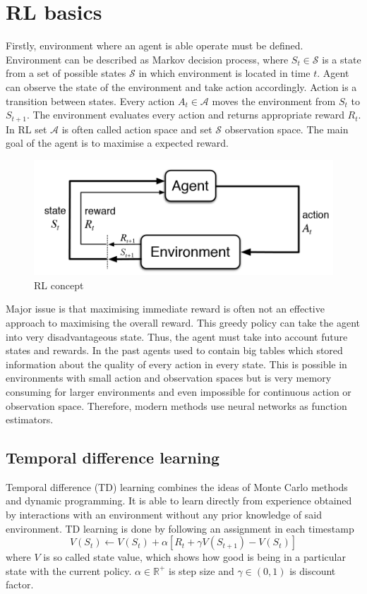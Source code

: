 \section{RL basics}
Firstly, environment where an agent is able operate must be defined. Environment can be described as Markov decision process, where $S_t \in \mathcal{S}$ is a state from a set of possible states $\mathcal{S}$ in which environment is located in time $t$. Agent can observe the state of the environment and take action accordingly. Action is a transition between states. Every action $A_t \in \mathcal{A}$ moves the environment from $S_t$ to $S_{t+1}$. The environment evaluates every action and returns appropriate reward $R_t$. In RL set $\mathcal{A}$ is often called action space and set $\mathcal{S}$ observation space. The main goal of the agent is to maximise a expected reward.

\begin{figure}[!h]
\centering
\includegraphics[scale=0.3]{fig/RL-concept.png}
\caption{RL concept}
\end{figure}

Major issue is that maximising immediate reward is often not an effective approach to maximising the overall reward. This greedy policy can take the agent into very disadvantageous state. Thus, the agent must take into account future states and rewards. In the past agents used to contain big tables which stored information about the quality of every action in every state. This is possible in environments with small action and observation spaces but is very memory consuming for larger environments and even impossible for continuous action or observation space. Therefore, modern methods use neural networks as function estimators.

\subsection{Temporal difference learning}
Temporal difference (TD) learning combines the ideas of Monte Carlo methods and dynamic programming. It is able to learn directly from experience obtained by interactions with an environment without any prior knowledge of said environment. TD learning is done by following an assignment in each timestamp \cite{sutton2012}
\begin{equation}
V(S_t) \gets V(S_t) + \alpha [R_{t} + \gamma V(S_{t+1}) - V(S_t)]
\end{equation}
where $V$ is so called state value, which shows how good is being in a particular state with the current policy. $\alpha \in \mathbb{R}^+$ is step size and $\gamma \in (0, 1)$ is discount factor.

